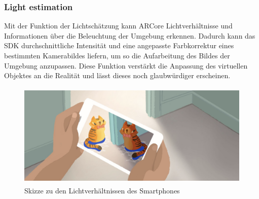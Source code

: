 \subsubsection*{Light estimation}
Mit der Funktion der Lichtschätzung kann ARCore Lichtverhältnisse und Informationen über die Beleuchtung der Umgebung erkennen. Dadurch kann das 
\acs{SDK} durchschnittliche Intensität und eine angepasste Farbkorrektur eines bestimmten Kamerabildes liefern, um so die Aufarbeitung des Bildes 
der Umgebung anzupassen. Diese Funktion verstärkt die Anpassung des virtuellen Objektes an die Realität und lässt dieses noch glaubwürdiger 
erscheinen.
\begin{figure}[hbt!]
    \centering
    \includegraphics[width=15cm,height=5cm,keepaspectratio]{2Grundlagen/Bilder/lightEstim.png}
    \caption{Skizze zu den Lichtverhältnissen des Smartphones \cite{arcoreofficial.2020j}}
    \label{pic:lightestim}
\end{figure}


